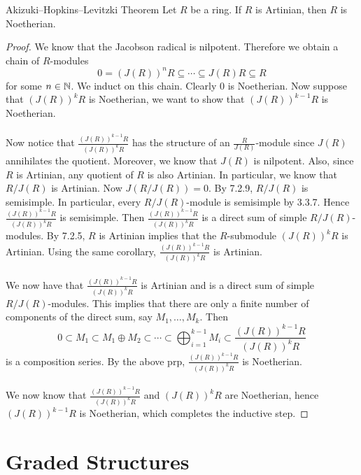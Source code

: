 \documentclass[a4paper]{article}
\begin{document}
\begin{thm}{Akizuki–Hopkins–Levitzki Theorem}{} Let $R$ be a ring. If $R$ is Artinian, then $R$ is Noetherian. 
\begin{proof}
We know that the Jacobson radical is nilpotent. Therefore we obtain a chain of $R$-modules $$0=(J(R))^nR\subseteq\cdots\subseteq J(R)R\subseteq R$$ for some $n\in\mathbb{N}$. We induct on this chain. Clearly $0$ is Noetherian. Now suppose that $(J(R))^kR$ is Noetherian, we want to show that $(J(R))^{k-1}R$ is Noetherian. \\~\\

Now notice that $\frac{(J(R))^{k-1}R}{(J(R))^kR}$ has the structure of an $\frac{R}{J(R)}$-module since $J(R)$ annihilates the quotient. Moreover, we know that $J(R)$ is nilpotent. Also, since $R$ is Artinian, any quotient of $R$ is also Artinian. In particular, we know that $R/J(R)$ is Artinian. Now $J(R/J(R))=0$. By 7.2.9, $R/J(R)$ is semisimple. In particular, every $R/J(R)$-module is semisimple by 3.3.7. Hence $\frac{(J(R))^{k-1}R}{(J(R))^kR}$ is semisimple. Then $\frac{(J(R))^{k-1}R}{(J(R))^kR}$ is a direct sum of simple $R/J(R)$-modules. By 7.2.5, $R$ is Artinian implies that the $R$-submodule $(J(R))^kR$ is Artinian. Using the same corollary, $\frac{(J(R))^{k-1}R}{(J(R))^kR}$ is Artinian. \\~\\

We now have that $\frac{(J(R))^{k-1}R}{(J(R))^kR}$ is Artinian and is a direct sum of simple $R/J(R)$-modules. This implies that there are only a finite number of components of the direct sum, say $M_1,\dots,M_k$. Then $$0\subset M_1\subset M_1\oplus M_2\subset\cdots\subset\bigoplus_{i=1}^{k-1}M_i\subset\frac{(J(R))^{k-1}R}{(J(R))^kR}$$ is a composition series. By the above prp, $\frac{(J(R))^{k-1}R}{(J(R))^kR}$ is Noetherian. \\~\\

We now know that $\frac{(J(R))^{k-1}R}{(J(R))^kR}$ and $(J(R))^kR$ are Noetherian, hence $(J(R))^{k-1}R$ is Noetherian, which completes the inductive step. 
\end{proof}
\end{thm}

\pagebreak
\section{Graded Structures}
\end{document}
